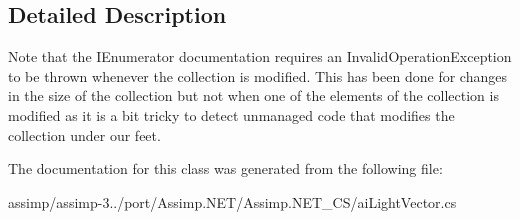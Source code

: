 \subsection{Detailed Description}
Note that the I\+Enumerator documentation requires an Invalid\+Operation\+Exception to be thrown whenever the collection is modified. This has been done for changes in the size of the collection but not when one of the elements of the collection is modified as it is a bit tricky to detect unmanaged code that modifies the collection under our feet. 

The documentation for this class was generated from the following file\+:\begin{DoxyCompactItemize}
\item 
assimp/assimp-\/3../port/\+Assimp.\+N\+E\+T/\+Assimp.\+N\+E\+T\+\_\+\+C\+S/ai\+Light\+Vector.\+cs\end{DoxyCompactItemize}
